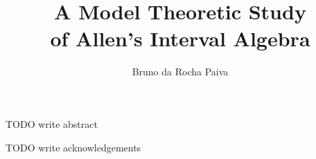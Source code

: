 \documentclass[11pt %
              ]{article}
\title{A Model Theoretic Study \\ of Allen's Interval Algebra}
\author{Bruno da Rocha Paiva}
\date{} %
\theoremstyle{plain}
\theoremstyle{definition}
\theoremstyle{remark}
\begin{document}



\newpage
{\color{orange} TODO write abstract}

\newpage
{\color{orange} TODO write acknowledgements}

\newpage
\tableofcontents

\newpage


\newpage


\newpage


\newpage


\newpage


\end{document}
